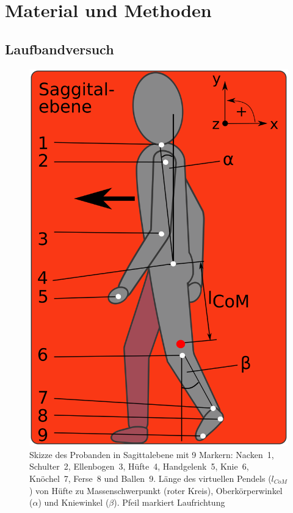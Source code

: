 \section{Material und Methoden}
\subsection{Laufbandversuch}
\begin{figure}
	\vspace{-40pt}
	\includegraphics[width=\linewidth]{bilder/Einleitung/Proband_Pendel}
	\vspace{-23pt}
	\caption[Untersuchte Parameter]{Skizze des Probanden in Sagittalebene mit 9 Markern: Nacken~1, Schulter~2, Ellenbogen~3, Hüfte~4, Handgelenk~5, Knie~6, Knöchel~7, Ferse~8 und Ballen~9. Länge des virtuellen Pendels ($l_{CoM}$) von Hüfte zu Massenschwerpunkt (roter Kreis), Oberkörperwinkel ($\alpha$) und Kniewinkel ($\beta$). Pfeil markiert Laufrichtung}
	\label{fig:Proband_Pendel}
\end{figure}

